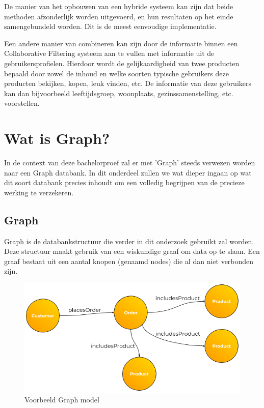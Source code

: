 De manier van het opbouwen van een hybride systeem kan zijn dat beide methoden afzonderlijk worden uitgevoerd, en hun resultaten op het einde samengebundeld worden. Dit is de meest eenvoudige implementatie.

Een andere manier van combineren kan zijn door de informatie binnen een Collaborative Filtering systeem aan te vullen met informatie uit de gebruikersprofielen. Hierdoor wordt de gelijkaardigheid van twee producten bepaald door zowel de inhoud en welke soorten typische gebruikers deze producten bekijken, kopen, leuk vinden, etc.
De informatie van deze gebruikers kan dan bijvoorbeeld leeftijdsgroep, woonplaats, gezinssamenstelling, etc. voorstellen.


\section{Wat is Graph?}
\label{sec:wat is Graph?}

In de context van deze bachelorproef zal er met 'Graph' steeds verwezen worden naar een Graph databank. In dit onderdeel zullen we wat dieper ingaan op wat dit soort databank precies inhoudt om een volledig begrijpen van de precieze werking te verzekeren. 

\subsection{Graph}
\label{sec:Graph}

Graph is de databankstructuur die verder in dit onderzoek gebruikt zal worden. Deze structuur maakt gebruik van een wiskundige graaf om data op te slaan. Een graaf bestaat uit een aantal knopen (genaamd nodes) die al dan niet verbonden zijn. 

\begin{figure} [ht]
	\centering
\includegraphics[width=\linewidth]{img/Customer-Order-Example-Graph.png}
	\caption[Voorbeeld Graph model]{Voorbeeld Graph model}
	\label{fig:GraphModelExample}
\end{figure}


